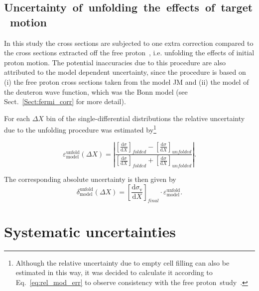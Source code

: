 \subsection{Uncertainty~of~unfolding~the~effects~of~target~motion}
\label{Sect:mod_dep2}

In this study the cross sections are subjected to one extra correction compared to the cross sections extracted off the free proton~\cite{Rip_an_note:2002,Ripani:2002ss,Fed_an_note:2007,Fedotov:2008aa,Isupov:2017lnd,Arjun,Fed_an_note:2017,Fed_paper_2018}, i.e. unfolding the effects of initial proton motion. The potential inaccuracies due to this procedure are also attributed to the model dependent uncertainty, since the procedure is based on (i) the free proton cross sections taken from the model JM and (ii) the model of the deuteron wave function, which was the Bonn model (see Sect.~\ref{Sect:fermi_corr} for more detail). 

For each $\Delta X$ bin of the single-differential distributions the relative uncertainty due to the unfolding procedure was estimated by\footnote[3]{Although the relative uncertainty due to empty cell filling can also be estimated in this way, it was decided to calculate it according to Eq.~\eqref{eq:rel_mod_err} to observe consistency with the free proton~study~\cite{Fed_an_note:2017}.}

\begin{equation}
\varepsilon^{\text{unfold}}_{\text{model}} (\Delta X) = \left |\dfrac{\left [ \frac{\textrm{d}\sigma}{\textrm{d}X} \right ]_{folded} - \left [ \frac{\textrm{d}\sigma}{\textrm{d}X} \right ]_{unfolded}}{\left [ \frac{\textrm{d}\sigma}{\textrm{d}X} \right ]_{folded} + \left [ \frac{\textrm{d}\sigma}{\textrm{d}X} \right ]_{unfolded}} \right |.
\label{eq:rel_mod_err_fermi}
\end{equation}

The corresponding absolute uncertainty is then given by
\begin{equation}
\delta^{\text{unfold}}_{\text{model}} (\Delta X) = \left [ \frac{\textrm{d}\sigma_{\text{v}}}{\textrm{d}X} \right ]_{final}\!\! \cdot \varepsilon^{\text{unfold}}_{\text{model}}.
\label{eq:error_stat_mod_fermi}
\end{equation}


\section{Systematic uncertainties}
\label{Sect:sys_uncert}

